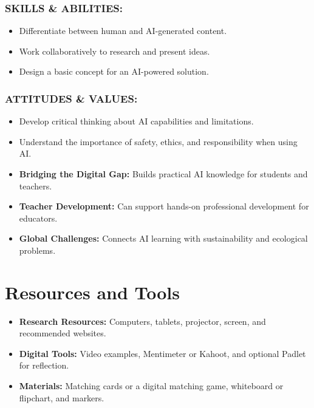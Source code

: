 \documentclass[11pt, a4paper]{article}
\begin{document}
\subsubsection*{SKILLS \& ABILITIES:}
\begin{itemize}
    \item Differentiate between human and AI-generated content.
    \item Work collaboratively to research and present ideas.
    \item Design a basic concept for an AI-powered solution.
\end{itemize}

\subsubsection*{ATTITUDES \& VALUES:}
\begin{itemize}
    \item Develop critical thinking about AI capabilities and limitations.
    \item Understand the importance of safety, ethics, and responsibility when using AI.
\end{itemize}

\begin{eurobox}
\begin{itemize}
    \item \textbf{Bridging the Digital Gap:} Builds practical AI knowledge for students and teachers.
    \item \textbf{Teacher Development:} Can support hands-on professional development for educators.
    \item \textbf{Global Challenges:} Connects AI learning with sustainability and ecological problems.
\end{itemize}
\end{eurobox}

\newpage
\section{Resources and Tools}
\begin{itemize}
    \item \textbf{Research Resources:} Computers, tablets, projector, screen, and recommended websites.
    \item \textbf{Digital Tools:} Video examples, Mentimeter or Kahoot, and optional Padlet for reflection.
    \item \textbf{Materials:} Matching cards or a digital matching game, whiteboard or flipchart, and markers.
\end{itemize}
\end{document}
